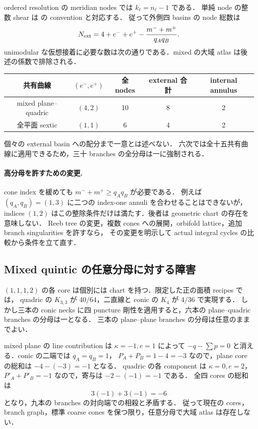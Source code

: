 ordered resolution の meridian nodes では $k_\ell=n_\ell-1$ である．
単純 node の整数 shear は \cite[\S4.3, equation (4.10)]{SymingtonFour}の convention と対応する．
従って外側四 basins の node 総数は
\[
 N_{\rm ext}=4+e^-+e^+-\frac{m^-+m^+}{q_Aq_B}.
\]
unimodular な仮想接着に必要な数は次の通りである．mixed の大域 atlas は後述の係数で排除される．
\begin{center}
\begin{tabular}{c|c|c|c|c}
共有曲線&$(e^-,e^+)$&全 nodes&external 合計&internal annulus\\\hline
mixed plane--quadric&$(4,2)$&10&8&2\\
全平面 sextic&$(1,1)$&6&4&2
\end{tabular}
\end{center}
個々の external basin への配分まで一意とは述べない．
六次では全十五共有曲線に適用できるため，三十 branches の全分母は一に強制される．

\paragraph{高分母を許すための変更.}
cone index を緩めても $m^-+m^+\ge q_Aq_B$ が必要である．
例えば $(q_A,q_B)=(1,3)$ に二つの index-one annuli を合わせることはできないが，
indices $(1,2)$ はこの整除条件だけは満たす．後者は geometric chart の存在を意味しない．
Reeb tree の変更，複数 cones への展開，orbifold lattice，追加 branch singularities を許すなら，
その変更を明示して actual integral cycles の比較から条件を立て直す．

\subsection{Mixed quintic の任意分母に対する障害}

$(1,1,1,2)$ の各 core は個別には chart を持つ．限定した正の面積 recipes では，
quadric の $K_{3,3}$ が $40/64$，二直線と conic の $K_4$ が $4/36$ で実現する．
しかし三本の conic necks に四 puncture 剛性を適用すると，六本の plane--quadric branches の分母は一となる．
三本の plane--plane branches の分母は任意のままでよい．

mixed plane の line contribution は $\kappa=-1,e=1$ によって
$-q-\sum p=0$ と消える．conic の二端では $q_A=q_B=1$，
$P_A+P_B=1-4=-3$ なので，plane core の総和は $-4-(-3)=-1$ となる．
quadric の各 component は $\kappa=0,e=2$，$P'_A+P'_B=-1$ なので，寄与は $-2-(-1)=-1$ である．
全四 cores の総和は
\[
 3(-1)+3(-1)=-6
\]
となり，九本の branches の対向端での相殺と矛盾する．
従って現在の cores，branch graph，標準 coarse cones を保つ限り，任意分母で大域 atlas は存在しない．

